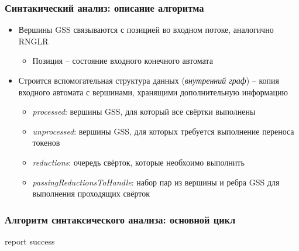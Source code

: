 \documentclass{beamer}
\begin{document}
\begin{frame}
    \transwipe[direction=90]
    \frametitle{Синтакический анализ: описание алгоритма}
    \begin{itemize}
    \item Вершины GSS связываются с позицией во входном потоке, аналогично RNGLR
        \begin{itemize}
        \item Позиция -- состояние входного конечного автомата        
        \end{itemize}    
    \item Строится вспомогательная структура данных (\emph{внутренний граф}) -- копия входного автомата с вершинами, хранящими дополнительную информацию
        \begin{itemize}
        \item \emph{processed}: вершины GSS, для который все свёртки выполнены 
        \item \emph{unprocessed}: вершины GSS, для которых требуется выполнение переноса токенов
        \item \emph{reductions}: очередь свёрток, которые необхоимо выполнить
        \item \emph{passingReductionsToHandle}: набор пар из вершины и ребра GSS для выполнения проходящих свёрток
        \end{itemize}
    \end{itemize}
\end{frame}

\begin{frame}[fragile] 
    \transwipe[direction=90]
    \frametitle{Алгоритм синтаксического анализа: основной цикл}
\begin{algorithmic}[1]
  \EndWhile
   {report success}
  \EndIf
\EndFunction
\end{algorithmic}
\end{frame}
\end{document}
